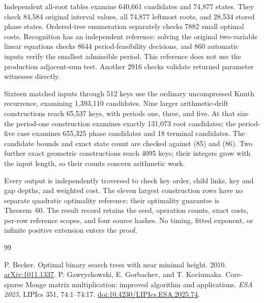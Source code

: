 \documentclass[11pt]{article}
\begin{document}
Independent all-root tables examine 640,661 candidates and 74,877 states.
They check 84,584 original interval values, all 74,877 leftmost roots, and
28,534 stored phase states. Ordered-tree enumeration separately checks
7882 small optimal costs. Recognition has an independent reference: solving
the original two-variable linear equations checks 8644 period-feasibility
decisions, and 860 automatic inputs verify the smallest admissible period.
This reference does not use the production adjacent-sum test. Another
2916 checks validate returned parameter witnesses directly.

Sixteen matched inputs through 512 keys use the ordinary uncompressed
Knuth recurrence, examining 1,393,110 candidates. Nine larger arithmetic-drift
constructions reach 65,537 keys, with periods one, three, and five. At that
size the period-one construction examines exactly 131,073 root candidates;
the period-five case examines 655,325 phase candidates and 18 terminal
candidates. The candidate bounds and exact state count are checked against
(85) and (86).
Two further exact geometric constructions reach 4095 keys; their integers
grow with the input length, so their counts concern arithmetic work.

Every output is independently traversed to check key order, child links,
key and gap depths, and weighted cost. The eleven largest construction rows
have no separate quadratic optimality reference; their optimality guarantee
is Theorem~60. The result record retains the seed,
operation counts, exact costs, per-row reference scopes, and four source
hashes. No timing, fitted exponent, or infinite positive extension enters
the proof.

\clearpage
\begingroup\small
\begin{thebibliography}{99}
\raggedright
{}
P. Becker. Optimal binary search trees with near minimal height. 2010.
\href{https://arxiv.org/abs/1011.1337}{arXiv:1011.1337}.
P. Gawrychowski, E. Gorbachev, and T. Kociumaka.
Core-sparse Monge matrix multiplication: improved algorithm and applications.
\emph{ESA 2025}, LIPIcs 351, 74:1--74:17.
\href{https://doi.org/10.4230/LIPIcs.ESA.2025.74}{doi:10.4230/LIPIcs.ESA.2025.74}.
\end{thebibliography}
\endgroup
\end{document}
